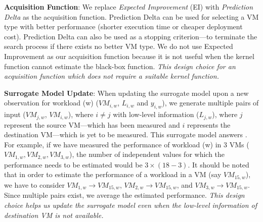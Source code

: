\noindent\textbf{Acquisition Function}: We replace \textit{Expected Improvement} (EI) with \textit{Prediction Delta} as the acquisition function. 
Prediction Delta can be used for selecting a VM type with better performance (shorter execution time or cheaper deployment cost).
Prediction Delta can also be used as a stopping criterion---to terminate the search process if there exists no better VM type. We do not use Expected Improvement as our acquisition function because it is not useful when the kernel function cannot estimate the black-box function. \textit{This design choice for an acquisition function which does not require a suitable kernel function.}

\noindent\textbf{Surrogate Model Update}: When updating the surrogate model upon a new observation for workload (w) ($\mathit{VM}_{i,w}$, $L_{i,w}$ and $y_{i,w}$), we generate multiple pairs of input ($\mathit{VM}_{j,w}$, $\mathit{VM}_{i,w}$), where $i\neq j$ with
low-level information ($L_{j,w}$), where $j$ represent the source VM---which has been measured and $i$ represents the destination VM---which is yet to be measured.
This surrogate model answers . For example, if we have measured the performance of workload (w) in 3 VMs ($VM_{1,w}, VM_{2,w}, VM_{3,w}$), the number of independent values for which the performance needs to be estimated would be $3 \times (18-3)$.
It should be noted that in order to estimate the performance of a workload in a VM (say $\mathit{VM}_{15,w}$),
we have to consider $\mathit{VM}_{1,w}\rightarrow\mathit{VM}_{15,w}$,  $\mathit{VM}_{2,w}\rightarrow\mathit{VM}_{15,w}$, and $\mathit{VM}_{3,w}\rightarrow\mathit{VM}_{15,w}$.  Since multiple pairs exist, we average the estimated performance. \textit{This design choice helps us update the surrogate model even when the low-level information of destination VM is not available.}
\fi
